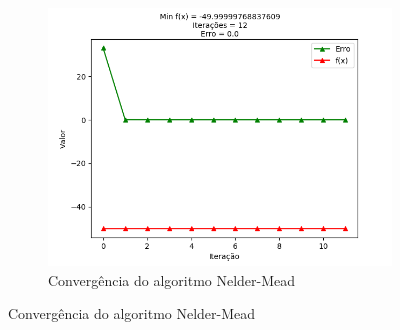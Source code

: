 \documentclass[a4paper, 12pt]{article}
\begin{document}
\begin{figure}[H]
\begin{subfigure}{0.3\textwidth}
  \includegraphics[width=\linewidth]{5/MPFE/A/Nelder-Mead/convergencia.png}
  \caption{Convergência do algoritmo Nelder-Mead}
\end{subfigure}
\label{fig:Q5BConvergencia}
\end{figure}
\end{document}
